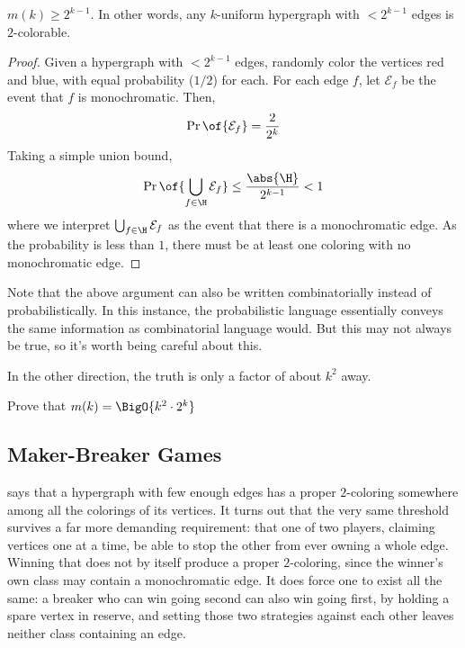 \begin{boxtheorem}\label{Ch1:Thm:mk_Lower_Bound}
    $m(k) \geq 2^{k - 1}$. In other words, any $k$-uniform hypergraph with $< 2^{k - 1}$ edges is $2$-colorable.
\end{boxtheorem}
\begin{proof}
    Given a hypergraph with $< 2^{k-1}$ edges, randomly color the vertices red and blue, with equal probability ($1/2$) for each. For each edge $f$, let $\mathcal{E}_f$ be the event that $f$ is monochromatic. Then,
    \begin{align*}
        \Pr\of{\mathcal{E}_f} = \frac{2}{2^k}
    \end{align*}
    Taking a simple union bound,
    \begin{align*}
        \Pr\of{\bigcup_{f \in \H} \mathcal{E}_f} \leq \frac{\abs{\H}}{2^{k - 1}} < 1
    \end{align*}
    where we interpret $\bigcup_{f \in \H} \mathcal{E}_f$ as the event that there is a monochromatic edge. As the probability is less than $1$, there must be at least one coloring with no monochromatic edge.
\end{proof}

Note that the above argument can also be written combinatorially instead of probabilistically. In this instance, the probabilistic language essentially conveys the same information as combinatorial language would. But this may not always be true, so it's worth being careful about this.

In the other direction, the truth is only a factor of about $k^2$ away.

\begin{boxexercise}
    Prove that $m(k) = \BigO{k^2 \cdot 2^k}$
\end{boxexercise}

\subsection{Maker-Breaker Games}

 says that a hypergraph with few enough edges has a proper $2$-coloring somewhere among all the colorings of its vertices. It turns out that the very same threshold survives a far more demanding requirement: that one of two players, claiming vertices one at a time, be able to stop the other from ever owning a whole edge. Winning that does not by itself produce a proper $2$-coloring, since the winner's own class may contain a monochromatic edge. It does force one to exist all the same: a breaker who can win going second can also win going first, by holding a spare vertex in reserve, and setting those two strategies against each other leaves neither class containing an edge.

